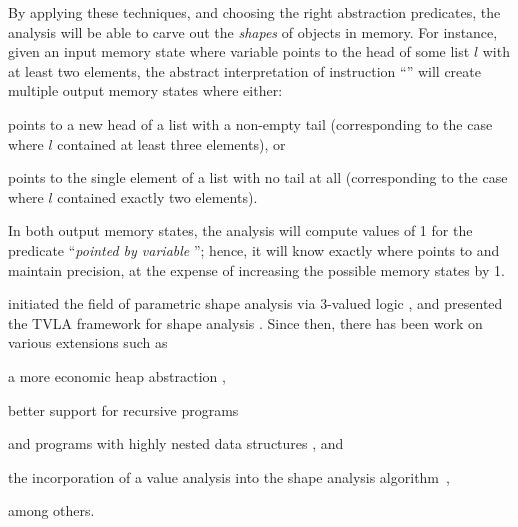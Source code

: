 By applying these techniques, and choosing the right abstraction
predicates, the analysis will be able to carve out the \emph{shapes}
of objects in memory. For instance, given an input memory state where
variable  points to the head of some list \(l\) with at least
two elements, the abstract interpretation of instruction ``'' will create multiple output memory states where either:
\begin{inparaenum}[(i)]
\item {} points to a new head of a list with a non-empty tail
  (corresponding to the case where \(l\) contained at least three
  elements), or
\item {} points to the single element of a list with no tail at
  all (corresponding to the case where \(l\) contained exactly two
  elements).
\end{inparaenum}
In both output memory states, the analysis will compute values of 1
for the predicate ``\emph{pointed by variable }''; hence, it
will know exactly where  points to and maintain precision,
at the expense of increasing the possible memory states by 1.

\citeauthor{popl/SagivRW99} initiated the field of parametric shape
analysis via 3-valued logic
\cite{toplas/SagivRW98,popl/SagivRW99,toplas/SagivRW02}, and
\citeauthor{sas/Lev-AmiS00} presented the TVLA framework for shape
analysis \cite{sas/Lev-AmiS00}. Since then, there has been work on
various extensions such as
\begin{inparablank}
\item a more economic heap abstraction \cite{sas/ManevichSRF04},
\item better support for recursive programs \cite{cc/RinetzkyS01}
\item and programs with highly nested data structures
  \cite{cav/BerdineCCDOWY07}, and
\item the incorporation of a value analysis into the shape analysis
  algorithm~\cite{sefm/FerraraFJ12},
\end{inparablank}
among others.



